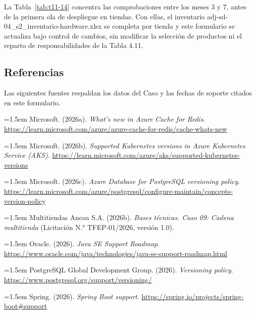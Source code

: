 \documentclass[11pt]{article}
\begin{document}
La Tabla~\mbox{\ref{tab:t11-14}} concentra las comprobaciones entre los meses 3 y 7, antes de la primera ola de despliegue en tiendas. Con ellas, el inventario adj-sd-04\_s2\_inventario-hardware.xlsx se completa por tienda y este formulario se actualiza bajo control de cambios, sin modificar la selección de productos ni el reparto de responsabilidades de la Tabla 4.11.

\subsection{Referencias}\label{t11-referencias}

Las siguientes fuentes respaldan los datos del Caso y las fechas de soporte citados en este formulario.

\noindent\hangindent=1.5em Microsoft. (2026a). \emph{What's new in Azure Cache for Redis}. \url{https://learn.microsoft.com/azure/azure-cache-for-redis/cache-whats-new}

\noindent\hangindent=1.5em Microsoft. (2026b). \emph{Supported Kubernetes versions in Azure Kubernetes Service (AKS)}. \url{https://learn.microsoft.com/azure/aks/supported-kubernetes-versions}

\noindent\hangindent=1.5em Microsoft. (2026c). \emph{Azure Database for PostgreSQL versioning policy}. \url{https://learn.microsoft.com/azure/postgresql/configure-maintain/concepts-version-policy}

\noindent\hangindent=1.5em Multitiendas Ancoa S.A. (2026b). \emph{Bases técnicas. Caso 09: Cadena multitienda} (Licitación N.° TFEP-01/2026, versión 1.0).

\noindent\hangindent=1.5em Oracle. (2026). \emph{Java SE Support Roadmap}. \url{https://www.oracle.com/java/technologies/java-se-support-roadmap.html}

\noindent\hangindent=1.5em PostgreSQL Global Development Group. (2026). \emph{Versioning policy}. \url{https://www.postgresql.org/support/versioning/}

\noindent\hangindent=1.5em Spring. (2026). \emph{Spring Boot support}. \url{https://spring.io/projects/spring-boot#support}

\ossFinalPage
\end{document}
